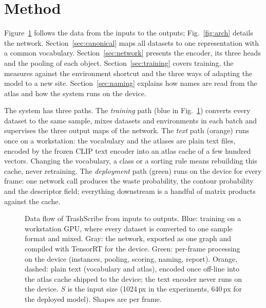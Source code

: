 \documentclass[pdflatex,sn-basic,Numbered]{sn-jnl}%
\newcommand{\trashscribe}{TrashScribe}
\begin{document}
\section{Method}\label{sec:method}

Figure~\ref{fig:pipeline} follows the data from the inputs to the outputs; Fig.~\ref{fig:arch} details the network. Section~\ref{sec:canonical} maps all datasets to one representation with a common vocabulary. Section~\ref{sec:network} presents the encoder, its three heads and the pooling of each object. Section~\ref{sec:training} covers training, the measures against the environment shortcut and the three ways of adapting the model to a new site. Section~\ref{sec:naming} explains how names are read from the atlas and how the system runs on the device.

The system has three paths. The \emph{training} path (blue in Fig.~\ref{fig:pipeline}) converts every dataset to the same sample, mixes datasets and environments in each batch and supervises the three output maps of the network. The \emph{text} path (orange) runs once on a workstation: the vocabulary and the atlases are plain text files, encoded by the frozen CLIP text encoder into an atlas cache of a few hundred vectors. Changing the vocabulary, a class or a sorting rule means rebuilding this cache, never retraining. The \emph{deployment} path (green) runs on the device for every frame: one network call produces the waste probability, the contour probability and the descriptor field; everything downstream is a handful of matrix products against the cache.

\begin{figure}[t]
\centering
\resizebox{\linewidth}{!}{}
\caption{Data flow of \trashscribe{} from inputs to outputs. Blue: training on a workstation GPU, where every dataset is converted to one sample format and mixed. Gray: the network, exported as one graph and compiled with TensorRT for the device. Green: per-frame processing on the device (instances, pooling, scoring, naming, report). Orange, dashed: plain text (vocabulary and atlas), encoded once off-line into the atlas cache shipped to the device; the text encoder never runs on the device. $S$ is the input size (1024\,px in the experiments, 640\,px for the deployed model). Shapes are per frame.}\label{fig:pipeline}
\end{figure}
\end{document}
